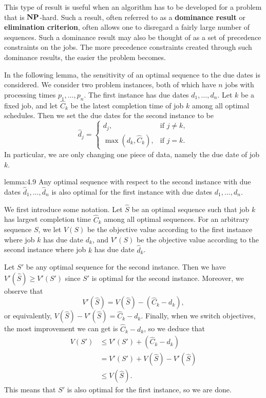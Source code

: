 This type of result is useful when an algorithm has to be developed for
a problem that is $\operatorname{\textbf{NP}}$-hard. Such a result, often referred to as a 
{\bf dominance result} or {\bf elimination criterion}, often allows one to
disregard a fairly large number of sequences. Such a dominance result may also 
be thought of as a set of precedence constraints on the jobs. The more 
precedence constraints created through such dominance results, the easier the 
problem becomes.

In the following lemma, the sensitivity of an optimal sequence to the due
dates is considered. We consider two problem instances, both of which have 
$n$ jobs with processing times $p_1, \dots, p_n$. The first instance has 
due dates $d_1, \dots, d_n$. Let $k$ be a fixed job, and let $\hat C_k$ 
be the latest completion time of job $k$ among all optimal schedules. 
Then we set the due dates for the second instance to be 
\[ \hat d_j = \begin{cases}
    d_j, & \text{if } j \neq k, \\ 
    \max(d_k, \hat C_k), & \text{if } j = k.
\end{cases} \] 
In particular, we are only changing one piece of data, namely the 
due date of job $k$. 

\begin{lemma}{lemma:4.9}
    Any optimal sequence with respect to the second instance with due dates 
    $\hat d_1, \dots, \hat d_n$ is also optimal for the first instance 
    with due dates $d_1, \dots, d_n$. 
\end{lemma}
\begin{pf}
    We first introduce some notation. Let $\hat S$ be an optimal sequence 
    such that job $k$ has largest completion time $\hat C_k$ among 
    all optimal sequences. For an arbitrary sequence $S$, we let 
    $V(S)$ be the objective value according to the first instance 
    where job $k$ has due date $d_k$, and $V'(S)$ be the objective 
    value according to the second instance where job $k$ has due date 
    $\hat d_k$. 

    Let $S'$ be any optimal sequence for the second instance. Then we have 
    $V'(\hat S) \geq V'(S')$ since $S'$ is optimal for the second instance. 
    Moreover, we observe that 
    \[ V'(\hat S) = V(\hat S) - (\hat C_k - d_k), \] 
    or equivalently, $V(\hat S) - V'(\hat S) = \hat C_k - d_k$. Finally, 
    when we switch objectives, the most improvement we can get is 
    $\hat C_k - d_k$, so we deduce that 
    \begin{align*}
        V(S') &\leq V'(S') + (\hat C_k - d_k) \\ 
        &= V'(S') + V(\hat S) - V'(\hat S) \\ 
        &\leq V(\hat S).
    \end{align*}
    This means that $S'$ is also optimal for the first instance, so we are done. 
\end{pf}
